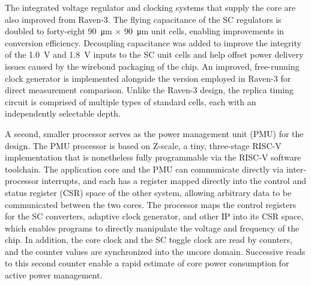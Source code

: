 \documentclass[graybox]{svmult}
\begin{document}
The integrated voltage regulator and clocking systems that supply the core are also improved from Raven-3.
The flying capacitance of the SC regulators is doubled to forty-eight \SI{90}{\micro\meter} $\times$ \SI{90}{\micro\meter} unit cells, enabling improvements in conversion efficiency.
Decoupling capacitance was added to improve the integrity of the \SI{1.0}{\volt} and \SI{1.8}{\volt} inputs to the SC unit cells and help offset power delivery issues caused by the wirebond packaging of the chip.
An improved, free-running clock generator is implemented alongside the version employed in Raven-3 for direct measurement comparison.
Unlike the Raven-3 design, the replica timing circuit is comprised of multiple types of standard cells, each with an independently selectable depth.

A second, smaller processor serves as the power management unit (PMU) for the design.
The PMU processor is based on Z-scale, a tiny, three-stage RISC-V implementation that is nonetheless fully programmable via the RISC-V software toolchain.
The application core and the PMU can communicate directly via inter-processor interrupts, and each has a register mapped directly into the control and status register (CSR) space of the other system, allowing arbitrary data to be communicated between the two cores.
The processor maps the control registers for the SC converters, adaptive clock generator, and other IP into its CSR space, which enables programs to directly manipulate the voltage and frequency of the chip.
In addition, the core clock and the SC toggle clock are read by counters, and the counter values are synchronized into the uncore domain.
Successive reads to this second counter enable a rapid estimate of core power consumption for active power management.
\end{document}

